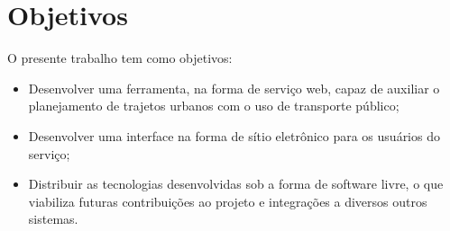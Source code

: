 \section{Objetivos}

O presente trabalho tem como objetivos:

\begin{itemize}
	\item Desenvolver uma ferramenta, na forma de serviço web, capaz de auxiliar o planejamento de trajetos urbanos com o uso de transporte público;
	\item Desenvolver uma interface na forma de sítio eletrônico para os usuários do serviço;
	\item Distribuir as tecnologias desenvolvidas sob a forma de software livre, o que viabiliza futuras contribuições ao projeto e integrações a diversos outros sistemas.
\end{itemize}

